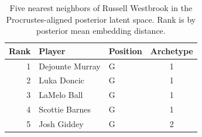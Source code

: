 \begin{table}[htbp]
  \centering\small
  \begin{tabular}{rllc}
    \toprule
    Rank & Player & Position & Archetype \\
    \midrule
    1 & Dejounte Murray & G & 1 \\
    2 & Luka Doncic & G & 1 \\
    3 & LaMelo Ball & G & 1 \\
    4 & Scottie Barnes & G & 1 \\
    5 & Josh Giddey & G & 2 \\
    \bottomrule
  \end{tabular}
  \caption{Five nearest neighbors of Russell Westbrook in the Procrustes-aligned posterior latent space. Rank is by posterior mean embedding distance.}
  \label{tab:Russell_Westbrook_neighbors}
\end{table}

